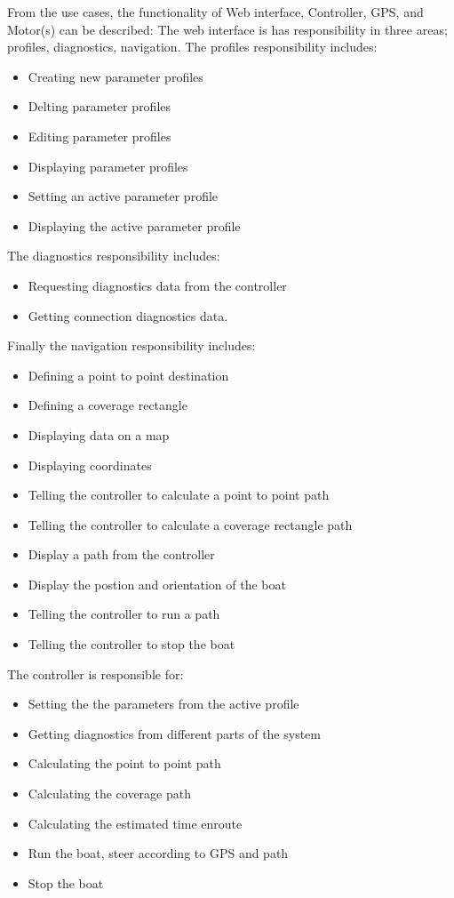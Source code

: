 From the use cases, the functionality of Web interface, Controller, GPS, and Motor(s) can be described:
The web interface is has responsibility in three areas; profiles, diagnostics, navigation.
The profiles responsibility includes:
\begin{itemize}
\item Creating new parameter profiles
\item Delting parameter profiles
\item Editing parameter profiles
\item Displaying parameter profiles
\item Setting an active parameter profile
\item Displaying the active parameter profile
\end{itemize}
The diagnostics responsibility includes:
\begin{itemize}
\item Requesting diagnostics data from the controller
\item Getting connection diagnostics data.
\end{itemize}
Finally the navigation responsibility includes:
\begin{itemize}
\item Defining a point to point destination
\item Defining a coverage rectangle
\item Displaying data on a map
\item Displaying coordinates
\item Telling the controller to calculate a point to point path
\item Telling the controller to calculate a coverage rectangle path
\item Display a path from the controller
\item Display the postion and orientation of the boat
\item Telling the controller to run a path
\item Telling the controller to stop the boat
\end{itemize}
The controller is responsible for:
\begin{itemize}
\item Setting the the parameters from the active profile
\item Getting diagnostics from different parts of the system
\item Calculating the point to point path
\item Calculating the coverage path
\item Calculating the estimated time enroute
\item Run the boat, steer according to GPS and path
\item Stop the boat
\end{itemize}

